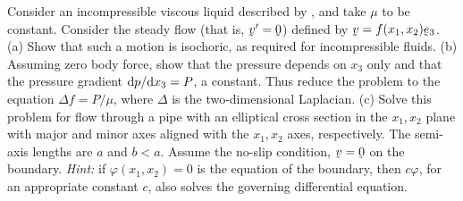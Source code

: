 \begin{problem}
Consider an incompressible viscous liquid described by , and
take $\mu$ to be constant. Consider the steady flow (that is,
$\bv'=\bze$) defined by $\bv=f(x_{1},x_{2})\be_{3}$.
(a) Show that such a motion is isochoric, as required for
incompressible fluids.
(b) Assuming zero body force, show that the pressure depends on $x_{3}$
only and that the pressure gradient $\mathrm{d} p/\mathrm{d} x_{3}=P$, a constant.
Thus reduce the problem to the equation $\Delta f=P/\mu$, where $\Delta$
is the two-dimensional Laplacian.
(c) Solve this problem for flow through a pipe with an elliptical cross
section in the $x_{1},x_{2}$ plane with major and minor axes aligned
with the $x_{1},x_{2}$ axes, respectively. The semi-axis lengths are $a$
and $b<a$. Assume the no-slip condition, $\bv=\bze$ on the boundary.
\emph{Hint:} if $\varphi(x_{1},x_{2})=0$ is the equation of the
boundary, then $c\varphi$, for an appropriate constant $c$, also solves
the governing differential equation.
\end{problem}

